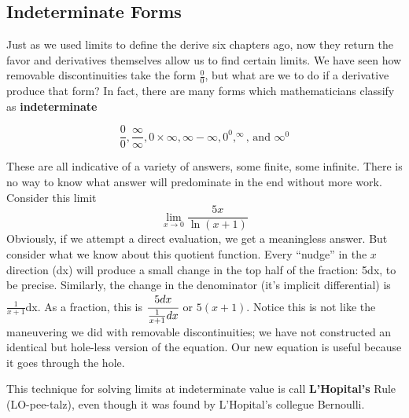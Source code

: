 
\subsection{Indeterminate Forms}



Just as we used limits to define the derive six chapters ago, now they return the favor
and derivatives themselves allow us to find certain limits.  We have seen how removable
discontinuities take the form $\frac{0}{0}$, but what are we to do if a derivative
produce that form?  In fact, there are many forms which mathematicians classify
as \textbf{indeterminate}

$$
\frac{0}{0} , \frac{\infty}{\infty} , 0\times\infty , \infty-\infty , 0^0 , ^\infty \text{, and } \infty^0 
$$

These are all indicative of a variety of answers, some finite, some infinite.  There is
no way to know what answer will predominate in the end without more work.
Consider this limit
\begin{equation}
\lim_{x\rightarrow0}\frac{5x}{\ln(x+1)}
\end{equation}
Obviously, if we attempt a direct evaluation, we get a meaningless answer.  But
consider what we know about this quotient function.  Every ``nudge'' in the $x$
direction (dx) will produce a small change in the top half of the fraction: 5dx, to
be precise.  Similarly, the change in the denominator (it's implicit differential)
is $\frac{1}{x+1}$dx.  As a fraction, this is $\cfrac{5dx}{\frac{1}{x+1}dx}$ or 
$5(x+1)$.  Notice this is not like the maneuvering we did with removable 
discontinuities; we have not constructed an identical but hole-less version
of the equation.  Our new equation is useful because it goes through the hole.


This technique for solving limits at indeterminate value is call \textbf{L'Hopital's}
Rule (LO-pee-talz), even though it was found by L'Hopital's collegue Bernoulli.


